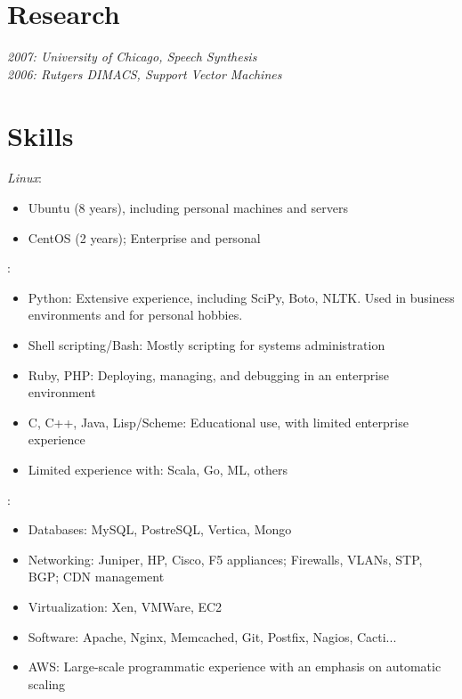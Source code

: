 \documentclass[9pt]{res} %
\begin{document}
\begin{resume}
\section{Research}
{\sl 2007: University of Chicago, Speech Synthesis} \\
{\sl 2006: Rutgers DIMACS, Support Vector Machines}

\section{Skills}
{\sl Linux}: 
\begin{itemize}
    \item Ubuntu (8 years), including personal machines and servers
    \item CentOS (2 years); Enterprise and personal
\end{itemize}
\vspace{-3mm}{\sl Languages}:
\begin{itemize}
    \item Python: Extensive experience, including SciPy, Boto, NLTK. Used in business environments and for personal hobbies.
    \item Shell scripting/Bash: Mostly scripting for systems administration
    \item Ruby, PHP: Deploying, managing, and debugging in an enterprise environment
    \item C, C++, Java, Lisp/Scheme: Educational use, with limited enterprise experience
    \item Limited experience with: Scala, Go, ML, others
\end{itemize}
\vspace{-3mm}{\sl Systems}:
\begin{itemize}
    \item Databases: MySQL, PostreSQL, Vertica, Mongo
    \item Networking: Juniper, HP, Cisco, F5 appliances; Firewalls, VLANs, STP, BGP; CDN management
    \item Virtualization: Xen, VMWare, EC2
    \item Software: Apache, Nginx, Memcached, Git, Postfix, Nagios, Cacti...
    \item AWS: Large-scale programmatic experience with an emphasis on automatic scaling
\end{itemize}




\end{resume}
\end{document}
